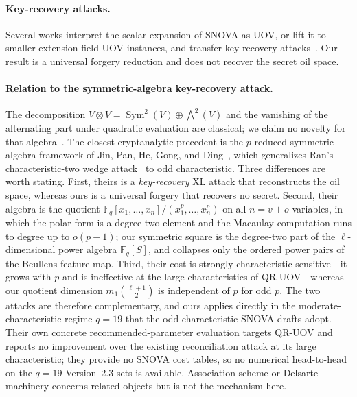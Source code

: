 \documentclass[runningheads]{llncs}
\newcommand{\F}{\mathbb F}
\newcommand{\Sym}{\operatorname{Sym}}
\newcommand{\SNOVA}{\textsf{SNOVA}}
\newcommand{\QRUOV}{\textsf{QR-UOV}}
\begin{document}
\paragraph{Key-recovery attacks.}
Several works interpret the scalar expansion of \SNOVA{} as UOV, or lift it to smaller extension-field UOV instances, and transfer key-recovery attacks~\cite{IkematsuAkiyama2024,LiDing2024,NakamuraEtAl2025}.  Our result is a universal forgery reduction and does not recover the secret oil space.

\paragraph{Relation to the symmetric-algebra key-recovery attack.}
The decomposition
$V\otimes V=\Sym^2(V)\oplus\bigwedge^2(V)$ and the vanishing of the alternating
part under quadratic evaluation are classical; we claim no novelty for that
algebra~\cite{Lam2005}.  The closest cryptanalytic precedent is the
$p$-reduced symmetric-algebra framework of Jin, Pan, He, Gong, and
Ding~\cite{JinEtAl2026}, which generalizes Ran's characteristic-two wedge
attack~\cite{Ran2026} to odd characteristic.  Three differences are worth
stating.  First, theirs is a \emph{key-recovery} XL attack that reconstructs the
oil space, whereas ours is a universal forgery that recovers no secret.  Second,
their algebra is the quotient $\F_q[x_1,\dots,x_n]/(x_1^p,\dots,x_n^p)$ on all
$n=v+o$ variables, in which the polar form is a degree-two element and the
Macaulay computation runs to degree up to $o(p-1)$; our symmetric square is the
degree-two part of the $\ell$-dimensional power algebra $\F_q[S]$, and collapses
only the ordered power pairs of the Beullens feature map.  Third, their cost is
strongly characteristic-sensitive---it grows with $p$ and is ineffective at the
large characteristics of \QRUOV{}---whereas our quotient dimension
$m_1\binom{\ell+1}{2}$ is independent of $p$ for odd $p$.  The two attacks are
therefore complementary, and ours applies directly in the moderate-characteristic
regime $q=19$ that the odd-characteristic \SNOVA{} drafts adopt.  Their own
concrete recommended-parameter evaluation targets \QRUOV{} and reports no
improvement over the existing reconciliation attack at its large characteristic;
they provide no \SNOVA{} cost tables, so no numerical head-to-head on the $q=19$
Version~2.3 sets is available.  Association-scheme or Delsarte machinery concerns
related objects but is not the mechanism here.
\end{document}

